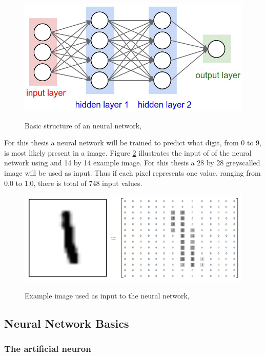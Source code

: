 \begin{figure}
  \centering
  \includegraphics[width=14cm]{NN}\\
  \caption{Basic structure of an neural network, \citet{karpathy2017}}%
  \label{fig:nn}
\end{figure}

For this thesis a neural network will be trained to predict what digit, from 0 to 9, is most likely present in a image.  Figure \ref{fig:mnist} illustrates the input of of the neural network using and 14 by 14 example image. For this thesis a 28 by 28 greyscalled image will be used as input. Thus if each pixel represents one value, ranging from 0.0 to 1.0, there is total of 748 input values. 

\begin{figure}
  \centering
  \includegraphics[width=14cm]{MNIST}\\
  \caption{Example image used as input to the neural network, \citet{tensor2017}}%
  \label{fig:mnist}
\end{figure}

\subsection{Neural Network Basics}

\subsubsection{The artificial neuron}

